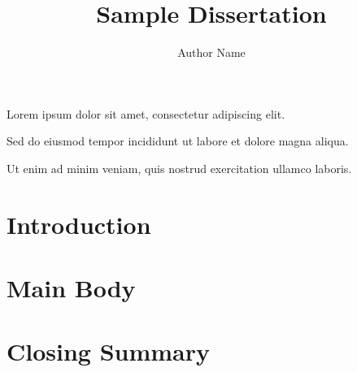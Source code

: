 \documentclass{ufdissertation}
\title{Sample Dissertation}
\author{Author Name}
\begin{document}
Lorem ipsum dolor sit amet, consectetur adipiscing elit.

Sed do eiusmod tempor incididunt ut labore et dolore magna aliqua.

Ut enim ad minim veniam, quis nostrud exercitation ullamco laboris.
\chapter{Introduction}
\chapter{Main Body}
\chapter{Closing Summary}
\end{document}
